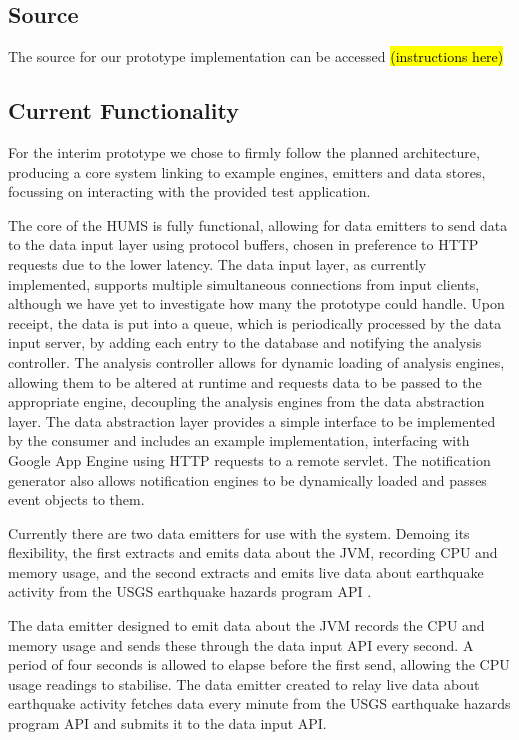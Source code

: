 \documentclass[10pt,a4paper]{article}
\begin{document}
\subsection{Source}

The source for our prototype implementation can be accessed \hl{(instructions here)}

\subsection{Current Functionality}
For the interim prototype we chose to firmly follow the planned architecture, producing a core system linking to example engines, emitters and data stores, focussing on interacting with the provided test application.

The core of the HUMS is fully functional, allowing for data emitters to send data to the data input layer using protocol buffers, chosen in preference to HTTP requests due to the lower latency. The data input layer, as currently implemented, supports multiple simultaneous connections from input clients, although we have yet to investigate how many the prototype could handle. Upon receipt, the data is put into a queue, which is periodically processed by the data input server, by adding each entry to the database and notifying the analysis controller. The analysis controller allows for dynamic loading of analysis engines, allowing them to be altered at runtime and requests data to be passed to the appropriate engine, decoupling the analysis engines from the data abstraction layer. The data abstraction layer provides a simple interface to be implemented by the consumer and includes an example implementation, interfacing with Google App Engine using HTTP requests to a remote servlet. The notification generator also allows notification engines to be dynamically loaded and passes event objects to them.

Currently there are two data emitters for use with the system. Demoing its flexibility, the first extracts and emits data about the JVM, recording CPU and memory usage, and the second extracts and emits live data about earthquake activity from the USGS earthquake hazards program API \cite{usgs}.

The data emitter designed to emit data about the JVM records the CPU and memory usage and sends these through the data input API every second. A period of four seconds is allowed to elapse before the first send, allowing the CPU usage readings to stabilise. The data emitter created to relay live data about earthquake activity fetches data every minute from the USGS earthquake hazards program API and submits it to the data input API.
\end{document}

